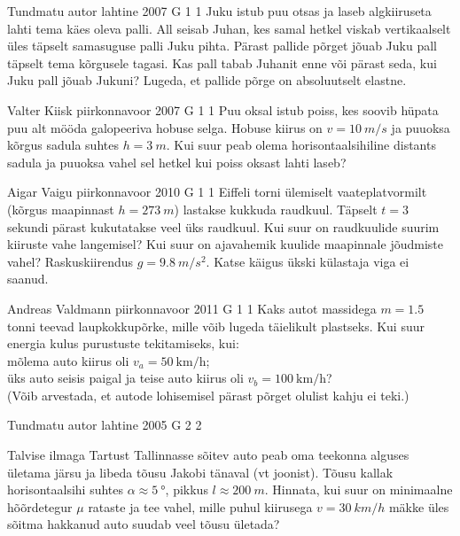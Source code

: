 \documentclass[11pt, twoside]{article}
\begin{document}
{%
{Tundmatu autor} %
{lahtine} %
{2007} %
{G 1} %
{1} %
{
\ifStatement
Juku istub puu otsas ja laseb algkiiruseta lahti tema käes oleva palli. All seisab Juhan, kes samal hetkel viskab vertikaalselt üles täpselt samasuguse palli Juku pihta. Pärast pallide põrget jõuab Juku pall täpselt tema kõrgusele tagasi. Kas pall tabab Juhanit enne või pärast seda, kui Juku pall jõuab Jukuni? Lugeda, et pallide põrge on absoluutselt elastne.
\fi
}

{Valter Kiisk} %
{piirkonnavoor} %
{2007} %
{G 1} %
{1} %
{
\ifStatement
Puu oksal istub poiss, kes soovib hüpata puu alt mööda galopeeriva hobuse selga. Hobuse kiirus on $v = \SI{10}{m/s}$ ja puuoksa kõrgus sadula suhtes $h = \SI{3}{m}$. Kui suur peab olema horisontaalsihiline distants sadula ja puuoksa vahel sel hetkel kui poiss oksast lahti laseb?
\fi
}

{Aigar Vaigu} %
{piirkonnavoor} %
{2010} %
{G 1} %
{1} %
{
\ifStatement
Eiffeli torni ülemiselt vaateplatvormilt (kõrgus maapinnast
$h=\SI{273}{m}$) lastakse kukkuda raudkuul. Täpselt $t=3$ sekundi pärast kukutatakse
veel üks raudkuul. Kui suur on raudkuulide suurim
kiiruste vahe langemisel? Kui suur on ajavahemik kuulide maapinnale jõudmiste
vahel? Raskuskiirendus $g=\SI{9.8}{m/s^2}$. Katse käigus ükski külastaja viga ei saanud.
\fi
}

{Andreas Valdmann} %
{piirkonnavoor} %
{2011} %
{G 1} %
{1} %
{
\ifStatement
Kaks autot massidega $m=\SI{1,5}{}$ tonni teevad laupkokkupõrke, mille võib lugeda täielikult plastseks. Kui suur energia kulus purustuste tekitamiseks, kui:\\
\osa mõlema auto kiirus oli $v_a=\SI{50}{\kilo\metre\per\hour}$; \\
\osa üks auto seisis paigal ja teise auto kiirus oli $v_b=\SI{100}{\kilo\metre\per\hour}$?\\
(Võib arvestada, et autode lohisemisel pärast põrget olulist kahju ei teki.)
\fi
}

{Tundmatu autor} %
{lahtine} %
{2005} %
{G 2} %
{2} %
{
\ifStatement
Talvise ilmaga Tartust Tallinnasse sõitev auto peab oma teekonna alguses ületama järsu ja libeda tõusu Jakobi tänaval (vt joonist). Tõusu kallak horisontaalsihi suhtes $\alpha \approx \SI{5}{\degree}$, pikkus $l \approx \SI{200}{m}$. Hinnata, kui suur on minimaalne hõõrdetegur $\mu$ rataste ja tee vahel, mille puhul kiirusega $v = \SI{30}{km/h}$ mäkke üles sõitma hakkanud auto suudab veel tõusu ületada?

}}
\end{document}
